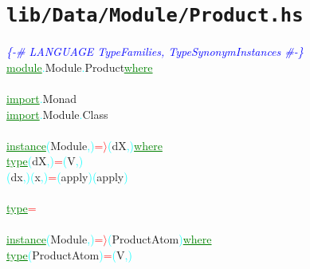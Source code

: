\section{\texttt{lib/Data/Module/Product.hs}}
\label{mod:Data.Module.Product}
\textcolor{blue}{{\it{}\{-\# LANGUAGE TypeFamilies, TypeSynonymInstances \#-\}}}\\\textcolor{green}{\underline{module}}\textcolor{cyan}{.}{\rm{}Module}\textcolor{cyan}{.}{\rm{}Product}\hsspace \textcolor{green}{\underline{where}}\\\\\textcolor{green}{\underline{import}}\textcolor{cyan}{.}{\rm{}Monad}\\\textcolor{green}{\underline{import}}\textcolor{cyan}{.}{\rm{}Module}\textcolor{cyan}{.}{\rm{}Class}\\\\\textcolor{green}{\underline{instance}}\hsspace \textcolor{cyan}{(}{\rm{}Module}\textcolor{cyan}{,}\textcolor{cyan}{)}\hsspace \textcolor{red}{=\ensuremath{\rangle}}\hsspace \textcolor{cyan}{(}{\rm{}dX}\textcolor{cyan}{,}\textcolor{cyan}{)}\hsspace \textcolor{green}{\underline{where}}\\\hstab \textcolor{green}{\underline{type}}\hsspace \textcolor{cyan}{(}{\rm{}dX}\textcolor{cyan}{,}\textcolor{cyan}{)}\hsspace \textcolor{red}{=}\hsspace \textcolor{cyan}{(}{\rm{}V}\textcolor{cyan}{,}\textcolor{cyan}{)}\\\hsspace \textcolor{cyan}{(}{\rm{}dx}\textcolor{cyan}{,}\textcolor{cyan}{)}\hsspace \textcolor{cyan}{(}{\rm{}x}\textcolor{cyan}{,}\textcolor{cyan}{)}\hsspace \textcolor{red}{=}\hsspace {\rm{}(,)}\hsspace \textcolor{cyan}{(}{\rm{}apply}\textcolor{cyan}{)}\hsspace \textcolor{cyan}{(}{\rm{}apply}\textcolor{cyan}{)}\\\\\textcolor{green}{\underline{type}}\hsspace \textcolor{red}{=}\\\\\textcolor{green}{\underline{instance}}\hsspace \textcolor{cyan}{(}{\rm{}Module}\textcolor{cyan}{,}\textcolor{cyan}{)}\hsspace \textcolor{red}{=\ensuremath{\rangle}}\hsspace \textcolor{cyan}{(}{\rm{}ProductAtom}\textcolor{cyan}{)}\hsspace \textcolor{green}{\underline{where}}\\\hstab \textcolor{green}{\underline{type}}\hsspace \textcolor{cyan}{(}{\rm{}ProductAtom}\textcolor{cyan}{)}\hsspace \textcolor{red}{=}\hsspace \textcolor{cyan}{(}{\rm{}V}\textcolor{cyan}{,}\textcolor{cyan}{)}\\\hsspace 